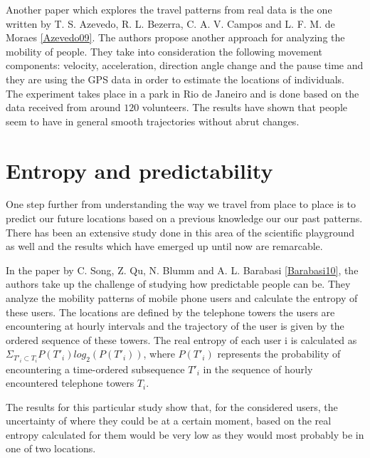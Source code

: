 Another paper which explores the travel patterns from real data is the one
written by T. S. Azevedo, R. L. Bezerra, C. A. V. Campos and L. F. M. de Moraes
\ref{Azevedo09}. The authors propose another approach for analyzing the mobility
of people. They take into consideration the following movement components:
velocity, acceleration, direction angle change and the pause time and they are
using the GPS data in order to estimate the locations of individuals. The
experiment takes place in a park in Rio de Janeiro and is done based on the
data received from around $120$ volunteers. The results have shown that people
seem to have in general smooth trajectories without abrut changes.

\section{Entropy and predictability}
One step further from understanding the way we travel from place to place is to
predict our future locations based on a previous knowledge our our past
patterns. There has been an extensive study done in this area of the scientific
playground as well and the results which have emerged up until now are
remarcable.

In the paper by C. Song, Z. Qu, N. Blumm and A. L. Barabasi \ref{Barabasi10},
the authors take up the challenge of studying how predictable people can be.
They analyze the mobility patterns of mobile phone users and calculate the
entropy of these users. The locations are defined by the telephone towers the
users are encountering at hourly intervals and the trajectory of the user is
given by the ordered sequence of these towers. The real entropy of each user i
is calculated as $\Sigma _{T'_{i}\subset T_{i}} P(T'_{i})log_{2}(P(T'_{i}))$,
where $P(T'_{i})$ represents the probability of encountering a time-ordered
subsequence $T'_{i}$ in the sequence of hourly encountered telephone towers
$T_{i}$.

The results for this particular study show that, for the considered users, the
uncertainty of where they could be at a certain moment, based on the real
entropy calculated for them would be very low as they would most probably be in
one of two locations.

